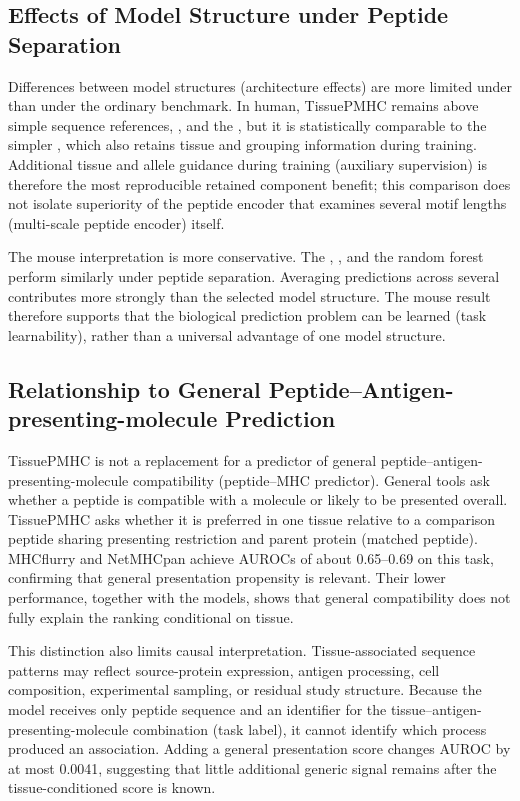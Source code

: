 \subsection{Effects of Model Structure under Peptide Separation}

Differences between model structures (architecture effects) are more limited under \plainPeptideOOF{} than under the ordinary benchmark. In human, TissuePMHC remains above simple sequence references, \plainSharedHeads{}, and the \plainPlainDual{}, but it is statistically comparable to the simpler \plainAuxDual{}, which also retains tissue and \plainHLA{} grouping information during training. Additional tissue and allele guidance during training (auxiliary supervision) is therefore the most reproducible retained component benefit; this comparison does not isolate superiority of the peptide encoder that examines several motif lengths (multi-scale peptide encoder) itself.

The mouse interpretation is more conservative. The \plainMMoE{}, \plainSharedHeads{}, and the \plainBLOSUM{} random forest perform similarly under peptide separation. Averaging predictions across several \plainSeeds{} contributes more strongly than the selected model structure. The mouse result therefore supports that the biological prediction problem can be learned (task learnability), rather than a universal advantage of one model structure.

\subsection{Relationship to General Peptide--Antigen-presenting-molecule Prediction}

TissuePMHC is not a replacement for a predictor of general peptide--antigen-presenting-molecule compatibility (peptide--MHC predictor). General tools ask whether a peptide is compatible with a \plainMHC{} molecule or likely to be presented overall. TissuePMHC asks whether it is preferred in one tissue relative to a comparison peptide sharing presenting restriction and parent protein (matched peptide). MHCflurry and NetMHCpan achieve AUROCs of about 0.65--0.69 on this task, confirming that general presentation propensity is relevant. Their lower performance, together with the \plainMHCOnly{} models, shows that general compatibility does not fully explain the ranking conditional on tissue.

This distinction also limits causal interpretation. Tissue-associated sequence patterns may reflect source-protein expression, antigen processing, cell composition, experimental sampling, or residual study structure. Because the model receives only peptide sequence and an identifier for the tissue--antigen-presenting-molecule combination (task label), it cannot identify which process produced an association. Adding a general presentation score changes AUROC by at most 0.0041, suggesting that little additional generic signal remains after the tissue-conditioned score is known.

